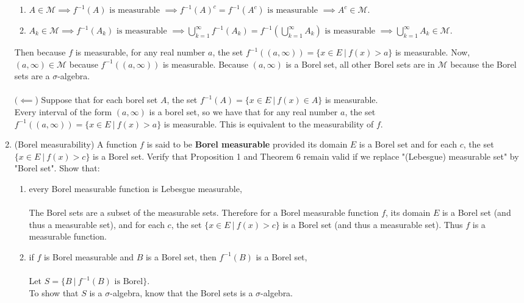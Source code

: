 \begin{enumerate}
\begin{enumerate}[label=(\roman*),align=left]
		\item $A\in \mathcal{M}\implies f^{-1}(A)\text{ is measurable }\implies f^{-1}(A)^c=f^{-1}(A^c)\text{ is measurable }\implies A^c\in \mathcal{M}$.
		\item $A_k\in \mathcal{M}\implies f^{-1}(A_k)\text{ is measurable }\implies\bigcup_{k=1}^\infty f^{-1}(A_k)=f^{-1}(\bigcup_{k=1}^\infty A_k)\text{ is measurable }\implies \bigcup_{k=1}^\infty A_k\in \mathcal{M}$.
	\end{enumerate}
    Then because $f$ is measurable, for any real number $a$, the set $f^{-1}((a,\infty))=\{x\in E\ |\ f(x)>a\}$ is measurable.
    Now, $(a,\infty)\in\mathcal{M}$ because $f^{-1}((a,\infty))$ is measurable.
    Because $(a,\infty)$ is a Borel set, all other Borel sets are in $\mathcal{M}$ because the Borel sets are a $\sigma$-algebra.\\
    \\$(\impliedby$) Suppose that for each borel set $A$, the set $f^{-1}(A)=\{x\in E\ |\ f(x)\in A\}$ is measurable.\\
    Every interval of the form $(a,\infty)$ is a borel set, so we have that for any real number $a$, the set $f^{-1}((a,\infty))=\{x\in E\ |\ f(x)>a\}$ is measurable. This is equivalent to the measurability of $f$.
    \item (Borel measurability) A function $f$ is said to be \textbf{Borel measurable} provided its domain $E$ is a Borel set and for each $c$, the set $\{x\in E\ |\ f(x)>c\}$ is a Borel set.
    Verify that Proposition 1 and Theorem 6 remain valid if we replace "(Lebesgue) measurable set" by "Borel set".
    Show that:
    \begin{enumerate}[label=(\roman*),align=left]
        \item every Borel measurable function is Lebesgue measurable,\\
        \\The Borel sets are a subset of the measurable sets.
        Therefore for a Borel measurable function $f$, its domain $E$ is a Borel set (and thus a measurable set), and for each $c$, the set $\{x\in E\ |\ f(x)>c\}$ is a Borel set (and thus a measurable set).
        Thus $f$ is a measurable function.
        \item if $f$ is Borel measurable and $B$ is a Borel set, then $f^{-1}(B)$ is a Borel set,\\
        \\Let $S=\{B\ |\ f^{-1}(B)\text{ is Borel}\}$.\\
        To show that $S$ is a $\sigma$-algebra, know that the Borel sets is a $\sigma$-algebra.\\

\end{enumerate}
\end{enumerate}
